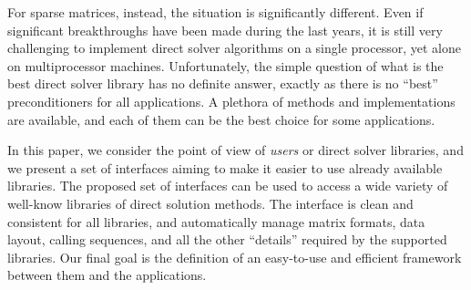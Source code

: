 \documentclass[acmtocl]{acmtrans2m}
\begin{document}
For sparse matrices, instead, the situation is significantly different.
Even if significant breakthroughs have been made during the last years,
it is still very challenging to implement direct solver algorithms
on a single processor, yet alone on multiprocessor machines. 
Unfortunately, the simple question of what is the best direct solver library
has no definite answer, exactly as there is no ``best'' preconditioners for
all applications. A plethora of methods and implementations are available, and
each of them can be the best choice for some applications. 

In this paper, we consider the point of view of {\sl users} or direct solver
libraries, and we present a set of interfaces aiming to make it easier to use
already available libraries. The proposed set of interfaces
can be used to access a wide variety of
well-know libraries of direct solution methods. The interface is clean and
consistent for all libraries, and automatically manage matrix formats, data
layout, calling sequences, and all the other ``details'' required by the
supported libraries. Our final goal is the
definition of an easy-to-use and efficient framework between them and the
applications. 
\end{document}
